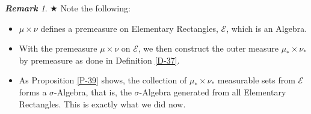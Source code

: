 \documentclass{article}
\theoremstyle{definition}
\theoremstyle{remark}
\newtheorem*{remark}{\textbf{Remark}}
\theoremstyle{definition}
\theoremstyle{definition}
\theoremstyle{definition}
\newcommand{\alg}[1]{\mathscr{#1}}
\begin{document}
\begin{remark}
	$ \bigstar $ Note the following:
	\begin{itemize}
		\item {$ \mu \times \nu $ defines a premeasure on Elementary Rectangles, $ \alg{E} $, which is an Algebra. }
		\item {With the premeasure $ \mu \times \nu $ on $ \alg{E} $, we then construct the outer measure $ \mu_{*}\times \nu_{*} $ by premeasure as done in Definition \ref{D-37}.}
		\item {As Proposition \ref{P-39} shows, the collection of $ \mu_{*} \times \nu_{*}$ measurable sets from $ \alg{E} $ forms a $ \sigma $-Algebra, that is, the $ \sigma $-Algebra generated from all Elementary Rectangles. This is exactly what we did now.}
	\end{itemize}
\end{remark}
\hrulefill
\newpage
\end{document}
